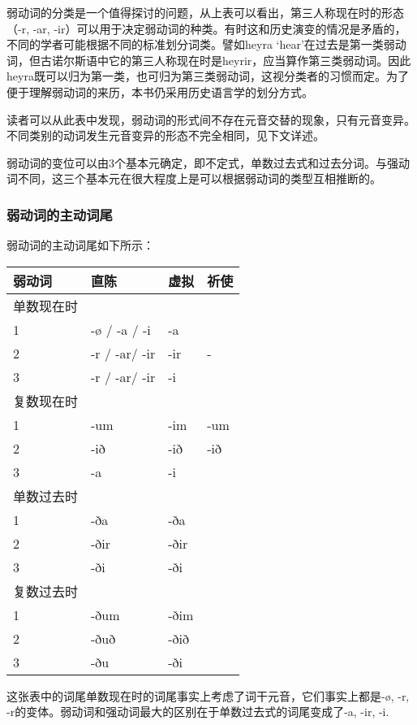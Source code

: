 弱动词的分类是一个值得探讨的问题，从上表可以看出，第三人称现在时的形态（-r,
-ar,
-ir）可以用于决定弱动词的种类。有时这和历史演变的情况是矛盾的，不同的学者可能根据不同的标准划分词类。譬如heyra
`hear‌'在过去是第一类弱动词，但古诺尔斯语中它的第三人称现在时是heyrir，应当算作第三类弱动词。因此heyra既可以归为第一类，也可归为第三类弱动词，这视分类者的习惯而定。为了便于理解弱动词的来历，本书仍采用历史语言学的划分方式。

读者可以从此表中发现，弱动词的形式间不存在元音交替的现象，只有元音变异。不同类别的动词发生元音变异的形态不完全相同，见下文详述。

弱动词的变位可以由3个基本元确定，即不定式，单数过去式和过去分词。与强动词不同，这三个基本元在很大程度上是可以根据弱动词的类型互相推断的。

\subsubsection{弱动词的主动词尾}\label{ux5f31ux52a8ux8bcdux7684ux4e3bux52a8ux8bcdux5c3e}

弱动词的主动词尾如下所示：

\begin{longtable}{llll}
\toprule
弱动词 & 直陈 & 虚拟 & 祈使 \\
\midrule
\endhead
\bottomrule
\endfoot
单数现在时 & & & \\
1 & -ø / -a / -i & -a & \\
2 & -r / -ar/ -ir & -ir & - \\
3 & -r / -ar/ -ir & -i & \\
复数现在时 & & & \\
1 & -um & -im & -um \\
2 & -ið & -ið & -ið \\
3 & -a & -i & \\
单数过去时 & & & \\
1 & -ða & -ða & \\
2 & -ðir & -ðir & \\
3 & -ði & -ði & \\
复数过去时 & & & \\
1 & -ðum & -ðim & \\
2 & -ðuð & -ðið & \\
3 & -ðu & -ði & \\
\end{longtable}

这张表中的词尾单数现在时的词尾事实上考虑了词干元音，它们事实上都是-ø,
-r, -r的变体。弱动词和强动词最大的区别在于单数过去式的词尾变成了-a, -ir,
-i.

